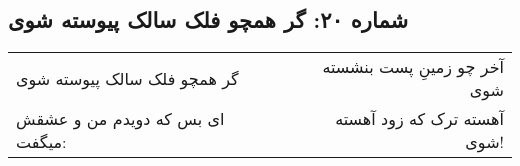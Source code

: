 \begin{center}
\section*{شماره ۲۰: گر همچو فلک سالک پیوسته شوی}
\label{sec:020}
\begin{longtable}{l p{0.5cm} r}
گر همچو فلک سالک پیوسته شوی
&&
آخر چو زمینِ پست بنشسته شوی
\\
ای بس که دویدم من و عشقش میگفت:
&&
آهسته ترک که زود آهسته شوی!
\\
\end{longtable}
\end{center}
